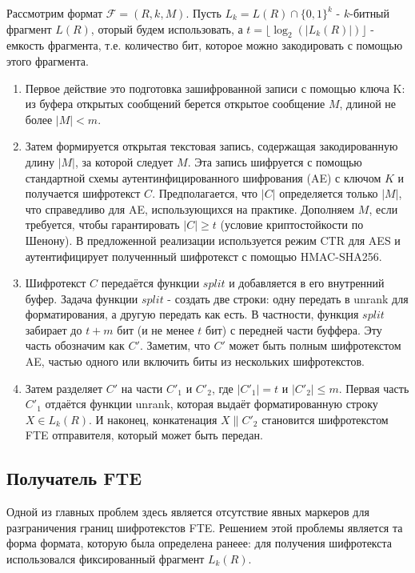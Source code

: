 Рассмотрим формат $\mathcal{F} = (R, k, M)$.
Пусть $L_k = L(R) \cap \{0, 1\}^k$ - $k$-битный фрагмент $L(R)$,
оторый будем использовать, а $t = \lfloor \log_2(|L_k(R)|) \rfloor$ - емкость фрагмента,
т.е. количество бит, которое можно закодировать с помощью этого фрагмента.

\begin{enumerate}
    \item Первое действие это подготовка зашифрованной записи с помощью ключа K:
          из буфера открытых сообщений берется открытое сообщение $M$, длиной не более $|M| < m$.
    \item Затем формируется открытая текстовая запись, содержащая закодированную длину $|M|$, за которой следует $M$.
          Эта запись шифруется с помощью стандартной схемы аутентинфицированного шифрования (AE) с ключом $K$ и получается шифротекст $C$.
          Предполагается, что $|C|$ определяется только $|M|$, что справедливо для AE, использующихся на практике.
          Дополняем $M$, если требуется, чтобы гарантировать $|C| \geq t$ (условие криптостойкости по Шенону).
          В предложенной реализации используется режим CTR для AES и аутентифицирует полученнный шифротекст с помощью HMAC-SHA256.
    \item Шифротекст $C$ передаётся функции $split$ и добавляется в его внутренний буфер.
          Задача функции $split$ - создать две строки: одну передать в unrank для форматирования, а другую передать как есть.
          В частности, функция $split$ забирает до $t + m$ бит (и не менее $t$ бит) с передней части буффера. Эту часть обозначим как $C'$.
          Заметим, что $C'$ может быть полным шифротекстом AE, частью одного или включить биты из нескольких шифротекстов.
    \item Затем разделяет $C'$ на части $C'_1$ и $C'_2$, где $|C'_1| = t$ и $|C'_2| \leq m$.
          Первая часть $C'_1$ отдаётся функции unrank, которая выдаёт форматированную строку $X \in L_k(R)$.
          И наконец, конкатенация $X \| C'_2$ становится шифротекстом FTE отправителя, который может быть передан.
\end{enumerate}

\subsection{Получатель FTE}

Одной из главных проблем здесь является отсутствие явных маркеров для разграничения границ шифротекстов FTE.
Решением этой проблемы является та форма формата, которую была определена ранеее:
для получения шифротекста использовался фиксированный фрагмент $L_k(R)$.

